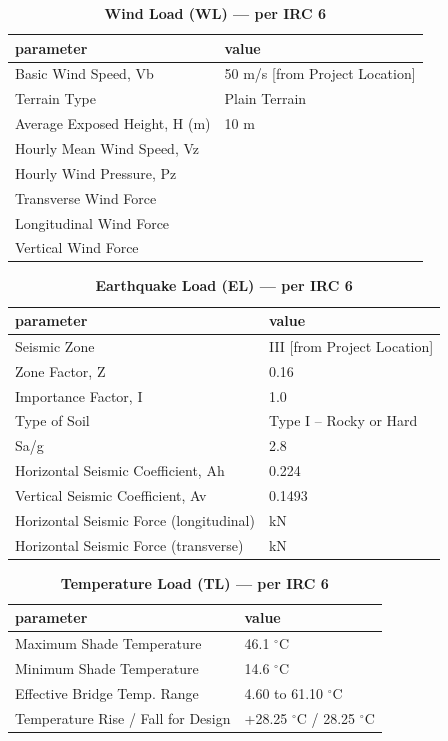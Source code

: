 \documentclass[12pt,a4paper]{report}
\numberwithin{table}{chapter}
\numberwithin{figure}{chapter}
\begin{document}
\vspace{1em}
\begin{longtable}{|L{5.5cm}|p{10.0cm}|}
\caption{\textbf{Wind Load (WL) --- per IRC 6}}
\hline
\textbf{parameter} & \textbf{value} \\
\hline
\textnormal{Basic Wind Speed, Vb} & 50 m/s [from Project Location] \\[6pt]
\hline
\textnormal{Terrain Type} & Plain Terrain \\[6pt]
\hline
\textnormal{Average Exposed Height, H (m)} & 10 m \\[6pt]
\hline
\textnormal{Hourly Mean Wind Speed, Vz} &  \\[6pt]
\hline
\textnormal{Hourly Wind Pressure, Pz} &  \\[6pt]
\hline
\textnormal{Transverse Wind Force} &  \\[6pt]
\hline
\textnormal{Longitudinal Wind Force} &  \\[6pt]
\hline
\textnormal{Vertical Wind Force} &  \\[6pt]
\hline
\end{longtable}

\vspace{1em}
\begin{longtable}{|L{5.5cm}|p{10.0cm}|}
\caption{\textbf{Earthquake Load (EL) --- per IRC 6}}
\hline
\textbf{parameter} & \textbf{value} \\
\hline
\textnormal{Seismic Zone} & III [from Project Location] \\[6pt]
\hline
\textnormal{Zone Factor, Z} & 0.16 \\[6pt]
\hline
\textnormal{Importance Factor, I} & 1.0 \\[6pt]
\hline
\textnormal{Type of Soil} & Type I – Rocky or Hard \\[6pt]
\hline
\textnormal{Sa/g} & 2.8 \\[6pt]
\hline
\textnormal{Horizontal Seismic Coefficient, Ah} & 0.224 \\[6pt]
\hline
\textnormal{Vertical Seismic Coefficient, Av} & 0.1493 \\[6pt]
\hline
\textnormal{Horizontal Seismic Force (longitudinal)} &  kN \\[6pt]
\hline
\textnormal{Horizontal Seismic Force (transverse)} &  kN \\[6pt]
\hline
\end{longtable}

\vspace{1em}
\begin{longtable}{|L{5.5cm}|p{10.0cm}|}
\caption{\textbf{Temperature Load (TL) --- per IRC 6}}
\hline
\textbf{parameter} & \textbf{value} \\
\hline
\textnormal{Maximum Shade Temperature} & 46.1 $^\circ$C \\[6pt]
\hline
\textnormal{Minimum Shade Temperature} & 14.6 $^\circ$C \\[6pt]
\hline
\textnormal{Effective Bridge Temp. Range} & 4.60 to 61.10 $^\circ$C \\[6pt]
\hline
\textnormal{Temperature Rise / Fall for Design} & +28.25 $^\circ$C / \textminus{}28.25 $^\circ$C \\[6pt]
\hline
\end{longtable}
\end{document}
